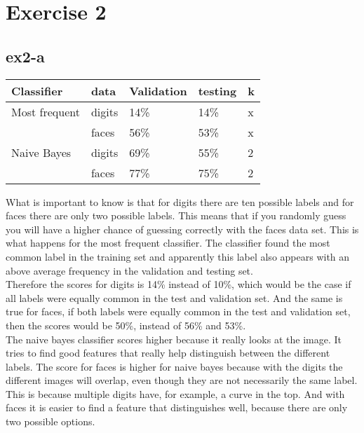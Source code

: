 \section{Exercise 2}
\subsection{ex2-a}
\begin{table}[]
\begin{tabular}{|l|l||l|l||l|}
\hline
Classifier    & data   & Validation & testing & k \\ \hline
Most frequent & digits & 14\%       & 14\%    & x \\ 
              & faces  & 56\%       & 53\%    & x \\ \hline
Naive Bayes   & digits & 69\%       & 55\%    & 2 \\ 
              & faces  & 77\%       & 75\%    & 2 \\ \hline

\end{tabular}
\end{table}

What is important to know is that for digits there are ten possible labels and for faces there
are only two possible labels. This means that if you randomly guess you will have a higher chance
of guessing correctly with the faces data set. This is what happens for the most frequent 
classifier. The classifier found the most common label in the training set and apparently 
this label also appears with an above average frequency in the validation and testing set.\\
Therefore the scores for digits is 14\% instead of 10\%, which would be the case if all labels
were equally common in the test and validation set. And the same is true for faces, if both 
labels were equally common in the test and validation set, then the scores would be 50\%, 
instead of 56\% and 53\%.\\
The naive bayes classifier scores higher because it really looks at the image. It tries to
find good features that really help distinguish between the different labels.
The score for faces is higher for naive bayes because with the digits the different images will
overlap, even though they are not necessarily the same label. This is because multiple digits 
have, for example, a curve in the top. And with faces it is easier to find a feature that
distinguishes well, because there are only two possible options.

